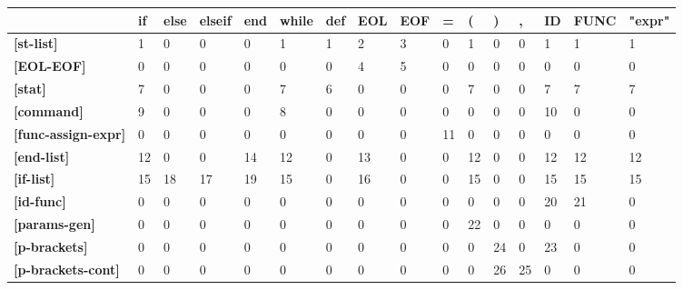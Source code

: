 \documentclass[11pt, a4paper]{article}
\begin{document}
\begin{table}[]
\setlength{\tabcolsep}{4pt}
\centering
{}
\begin{tabular}{l|l|l|l|l|l|l|l|l|l|l|l|l|l|l|l}
                       & \textbf{if} & \textbf{else} & \textbf{elseif} & \textbf{end} & \textbf{while} & \textbf{def} & \textbf{EOL} & \textbf{EOF} & \textbf{=}  & \textbf{(}  & \textbf{)}  & \textbf{,}  & \textbf{ID} & \textbf{FUNC} & \textbf{"expr"} \\\hline
\textbf{{[}st-list{]} }         & 1  & 0    & 0     & 0   & 1     & 1   & 2   & 3   & 0  & 1  & 0  & 0  & 1  & 1    & 1      \\\hline
\textbf{{[}EOL-EOF{]}}          & 0  & 0    & 0     & 0   & 0     & 0   & 4   & 5   & 0  & 0  & 0  & 0  & 0  & 0    & 0      \\\hline
\textbf{{[}stat{]}}             & 7  & 0    & 0     & 0   & 7     & 6   & 0   & 0   & 0  & 7  & 0  & 0  & 7  & 7    & 7      \\\hline
\textbf{{[}command{]} }         & 9  & 0    & 0     & 0   & 8     & 0   & 0   & 0   & 0  & 0  & 0  & 0  & 10 & 0    & 0      \\\hline
\textbf{{[}func-assign-expr{]}} & 0  & 0    & 0     & 0   & 0     & 0   & 0   & 0   & 11 & 0  & 0  & 0  & 0  & 0    & 0      \\\hline
\textbf{{[}end-list{]} }        & 12 & 0    & 0     & 14  & 12    & 0   & 13  & 0   & 0  & 12 & 0  & 0  & 12 & 12   & 12     \\\hline
\textbf{{[}if-list{]}}          & 15 & 18   & 17    & 19  & 15    & 0   & 16  & 0   & 0  & 15 & 0  & 0  & 15 & 15   & 15     \\\hline
\textbf{{[}id-func{]}}          & 0  & 0    & 0     & 0   & 0     & 0   & 0   & 0   & 0  & 0  & 0  & 0  & 20 & 21   & 0      \\\hline
\textbf{{[}params-gen{]}}       & 0  & 0    & 0     & 0   & 0     & 0   & 0   & 0   & 0  & 22 & 0  & 0  & 0  & 0    & 0      \\\hline
\textbf{{[}p-brackets{]}}       & 0  & 0    & 0     & 0   & 0     & 0   & 0   & 0   & 0  & 0  & 24 & 0  & 23 & 0    & 0      \\\hline
\textbf{{[}p-brackets-cont{]}}  & 0  & 0    & 0     & 0   & 0     & 0   & 0   & 0   & 0  & 0  & 26 & 25 & 0  & 0    & 0     
\end{tabular}
\end{table}
\end{document}
